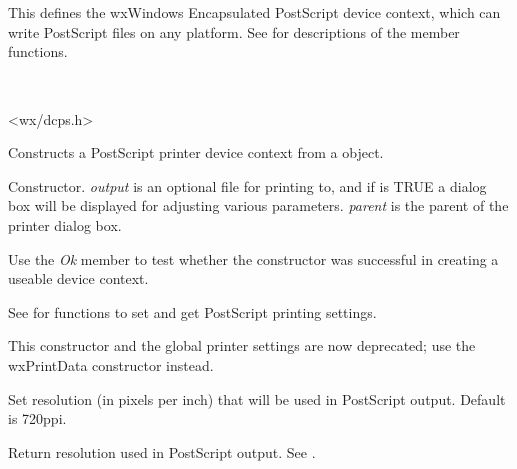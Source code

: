 \section{}\label{wxpostscriptdc}

This defines the wxWindows Encapsulated PostScript device context,
which can write PostScript files on any platform. See  for
descriptions of the member functions.


\\


<wx/dcps.h>



Constructs a PostScript printer device context from a  object.


Constructor. {\it output} is an optional file for printing to, and if
 is TRUE a dialog box will be displayed for adjusting
various parameters. {\it parent} is the parent of the printer dialog box.

Use the {\it Ok} member to test whether the constructor was successful
in creating a useable device context.

See  for functions to set and
get PostScript printing settings.

This constructor and the global printer settings are now deprecated;
use the wxPrintData constructor instead.


\label{wxpostscriptdcsetresolution}


Set resolution (in pixels per inch) that will be used in PostScript
output. Default is 720ppi.

\label{wxpostscriptdcgetresolution}


Return resolution used in PostScript output. See 
.

